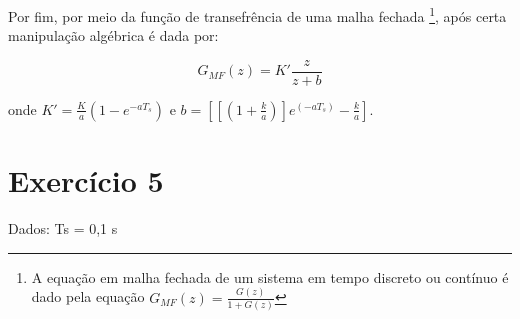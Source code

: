 \documentclass{article}
\begin{document}
Por fim, por meio da função de transefrência de uma malha fechada \footnote{A equação em malha fechada de um sistema em tempo discreto ou contínuo é dado pela equação $G_{MF}(z) = \frac{G(z)}{1+G(z)}$}, após certa manipulação algébrica é dada por:

\begin{equation}
G_{MF}(z) = K' \frac{z}{z+b}
\end{equation}

onde $K' = \frac{K}{a} (1-e^{-aT_s}) \mbox{ e } b = \left[\left[(1 + \frac{k}{a})\right]e^(-aT_s) - \frac{k}{a} \right] $.

\section*{Exercício 5} Dados: Ts = 0,1 s
\end{document}
